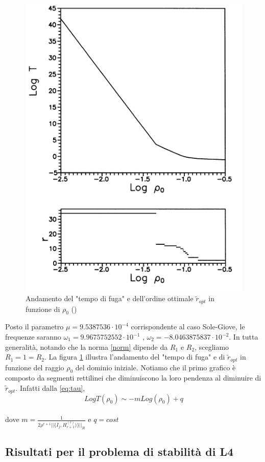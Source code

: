 \documentclass[a4paper,11pt,titlepage]{report}
\theoremstyle{definition}
\theoremstyle{plain}
\begin{document}
\begin{figure}[h]
	\label{Fig:T,rho}
	\centering
	\includegraphics[scale=0.8]{Immagini1997.png}
	\caption{Andamento del "tempo di fuga" e dell'ordine ottimale $\tilde{r}_{opt}$ in funzione di $\rho_0$ (\cite{OTSA})} 
\end{figure}

Posto il parametro $\mu= 9.5387536 \cdot 10^{-4}$ corrispondente al caso Sole-Giove, le frequenze saranno $\omega_1 = 9.9675752552 \cdot 10^{-1}$ , $\omega_2= -8.0463875837 \cdot 10^{-2}$.
In tutta generalità, notando che la norma \ref{norm} dipende da $R_1$ e $R_2$, scegliamo $R_1 = 1= R_2$.
La figura \ref{Fig:T,rho} illustra l'andamento del "tempo di fuga" e di $\tilde{r}_{opt}$ in funzione del raggio $\rho_0$ del dominio iniziale.
Notiamo che il primo grafico è composto da segmenti rettilinei che diminuiscono la loro pendenza al diminuire di $\tilde{r}_{opt}$.
Infatti dalla \ref{eq:tau}, $$ LogT(\rho_0) \sim -mLog(\rho_0)+q $$ \\dove $m = \frac{1}{2\rho^{r+1}||\{I_j, H_{r+1}^{(r)})\}||_{R} } $ e $q = cost$ 

\subsection{Risultati per il problema di stabilità di L4}
\end{document}
